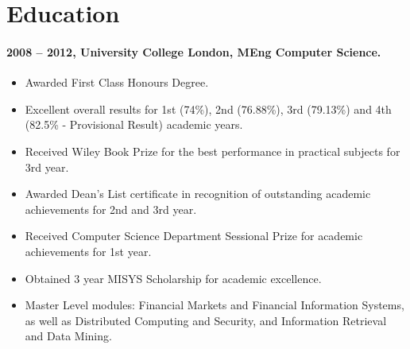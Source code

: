 \documentclass[11pt, a4paper]{article}
\newlength{\wideitemsep}
\let\olditem\item
\renewcommand{\item}{\setlength{\itemsep}{\wideitemsep}\olditem}
\begin{document}
\section*{Education}
\paragraph{2008 – 2012, University College London, MEng Computer Science.}
\begin{itemize}
\item Awarded First Class Honours Degree.
\item Excellent overall results for 1st (74\%), 2nd (76.88\%), 3rd (79.13\%) and 4th (82.5\% - Provisional Result) academic years.
\item Received Wiley Book Prize for the best performance in practical subjects for 3rd year.
\item Awarded Dean's List certificate in recognition of outstanding academic achievements for 2nd and 3rd year.
\item Received Computer Science Department Sessional Prize for academic achievements for 1st year.
\item Obtained 3 year MISYS Scholarship for academic excellence.
\item Master Level modules: Financial Markets and Financial Information Systems, as well as Distributed Computing and Security, and Information Retrieval and Data Mining.
\end{itemize}
\end{document}
